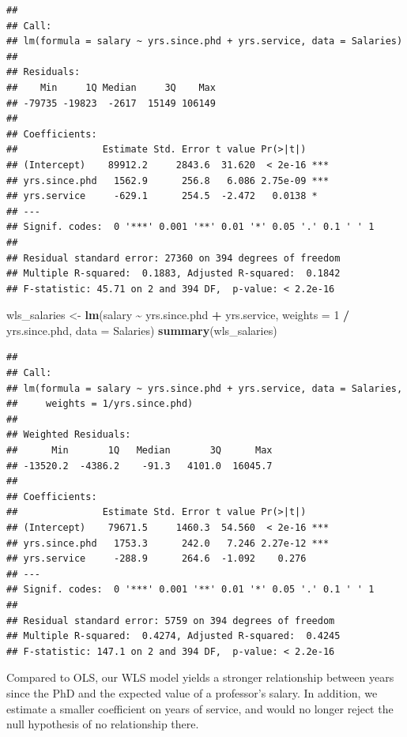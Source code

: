 \documentclass[
  12pt,
  oneside,openany]{book}
\newenvironment{Shaded}{\begin{snugshade}}{\end{snugshade}}
\newcommand{\DataTypeTok}[1]{\textcolor[rgb]{0.13,0.29,0.53}{#1}}
\newcommand{\DecValTok}[1]{\textcolor[rgb]{0.00,0.00,0.81}{#1}}
\newcommand{\KeywordTok}[1]{\textcolor[rgb]{0.13,0.29,0.53}{\textbf{#1}}}
\newcommand{\NormalTok}[1]{#1}
\newcommand{\OperatorTok}[1]{\textcolor[rgb]{0.81,0.36,0.00}{\textbf{#1}}}
\newcommand{\StringTok}[1]{\textcolor[rgb]{0.31,0.60,0.02}{#1}}
\begin{document}
\begin{verbatim}
## 
## Call:
## lm(formula = salary ~ yrs.since.phd + yrs.service, data = Salaries)
## 
## Residuals:
##    Min     1Q Median     3Q    Max 
## -79735 -19823  -2617  15149 106149 
## 
## Coefficients:
##               Estimate Std. Error t value Pr(>|t|)    
## (Intercept)    89912.2     2843.6  31.620  < 2e-16 ***
## yrs.since.phd   1562.9      256.8   6.086 2.75e-09 ***
## yrs.service     -629.1      254.5  -2.472   0.0138 *  
## ---
## Signif. codes:  0 '***' 0.001 '**' 0.01 '*' 0.05 '.' 0.1 ' ' 1
## 
## Residual standard error: 27360 on 394 degrees of freedom
## Multiple R-squared:  0.1883, Adjusted R-squared:  0.1842 
## F-statistic: 45.71 on 2 and 394 DF,  p-value: < 2.2e-16
\end{verbatim}

\begin{Shaded}
\begin{Highlighting}[]
\NormalTok{wls\_salaries <{-}}\StringTok{ }\KeywordTok{lm}\NormalTok{(salary }\OperatorTok{\textasciitilde{}}\StringTok{ }\NormalTok{yrs.since.phd }\OperatorTok{+}\StringTok{ }\NormalTok{yrs.service,}
                   \DataTypeTok{weights =} \DecValTok{1} \OperatorTok{/}\StringTok{ }\NormalTok{yrs.since.phd,}
                   \DataTypeTok{data =}\NormalTok{ Salaries)}
\KeywordTok{summary}\NormalTok{(wls\_salaries)}
\end{Highlighting}
\end{Shaded}

\begin{verbatim}
## 
## Call:
## lm(formula = salary ~ yrs.since.phd + yrs.service, data = Salaries, 
##     weights = 1/yrs.since.phd)
## 
## Weighted Residuals:
##      Min       1Q   Median       3Q      Max 
## -13520.2  -4386.2    -91.3   4101.0  16045.7 
## 
## Coefficients:
##               Estimate Std. Error t value Pr(>|t|)    
## (Intercept)    79671.5     1460.3  54.560  < 2e-16 ***
## yrs.since.phd   1753.3      242.0   7.246 2.27e-12 ***
## yrs.service     -288.9      264.6  -1.092    0.276    
## ---
## Signif. codes:  0 '***' 0.001 '**' 0.01 '*' 0.05 '.' 0.1 ' ' 1
## 
## Residual standard error: 5759 on 394 degrees of freedom
## Multiple R-squared:  0.4274, Adjusted R-squared:  0.4245 
## F-statistic: 147.1 on 2 and 394 DF,  p-value: < 2.2e-16
\end{verbatim}

Compared to OLS, our WLS model yields a stronger relationship between years since the PhD and the expected value of a professor's salary. In addition, we estimate a smaller coefficient on years of service, and would no longer reject the null hypothesis of no relationship there.
\end{document}
